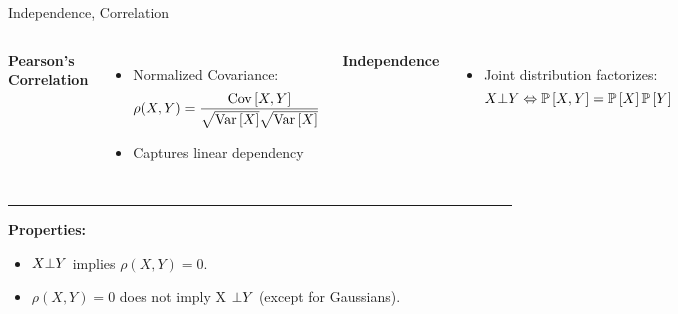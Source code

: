 \begin{frame}{Independence, Correlation}
    \label{appendix:correlation-independence}
    \begin{columns}[t]
        \textbf{Pearson's Correlation}
\begin{itemize}
    \item Normalized Covariance:
\begin{equation}
    \rho(X,Y) = \frac{\mathrm{Cov}\left[X,Y\right]}{\sqrt{\mathrm{Var}\left[X\right]} \sqrt{\mathrm{Var}\left[X\right]}}
\end{equation}
\item Captures linear dependency

\end{itemize}
    \hfill\vrule\hfill
{}
\textbf{Independence}
\begin{itemize}
    \item Joint distribution factorizes:
     \begin{equation}
        X \indep Y \Leftrightarrow \Pb[X,Y] = \Pb[X] \Pb[Y]
     \end{equation}
\end{itemize}
\end{columns}

\hrule
\begin{center}
\textbf{Properties:}
\begin{itemize}
    \item $X \bot Y$ implies $\rho(X,Y) = 0$.
    \item $\rho(X,Y) = 0$ does not imply X $\bot Y$ (except for Gaussians). 
\end{itemize}
\end{center}


\end{frame}
